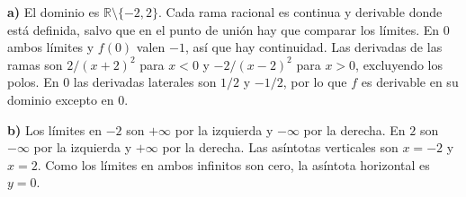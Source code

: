 \textbf{a)} El dominio es $\mathbb R\setminus\{-2,2\}$. Cada rama racional es continua y derivable donde está definida, salvo que en el punto de unión hay que comparar los límites. En $0$ ambos límites y $f(0)$ valen $-1$, así que hay continuidad. Las derivadas de las ramas son $2/(x+2)^2$ para $x<0$ y $-2/(x-2)^2$ para $x>0$, excluyendo los polos. En $0$ las derivadas laterales son $1/2$ y $-1/2$, por lo que $f$ es derivable en su dominio excepto en $0$.

\textbf{b)} Los límites en $-2$ son $+\infty$ por la izquierda y $-\infty$ por la derecha. En $2$ son $-\infty$ por la izquierda y $+\infty$ por la derecha. Las asíntotas verticales son $x=-2$ y $x=2$. Como los límites en ambos infinitos son cero, la asíntota horizontal es $y=0$.
